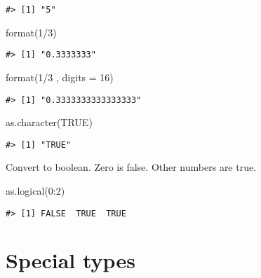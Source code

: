 \documentclass[
]{book}
\newenvironment{Shaded}{\begin{snugshade}}{\end{snugshade}}
\newcommand{\AttributeTok}[1]{\textcolor[rgb]{0.77,0.63,0.00}{#1}}
\newcommand{\ConstantTok}[1]{\textcolor[rgb]{0.00,0.00,0.00}{#1}}
\newcommand{\DecValTok}[1]{\textcolor[rgb]{0.00,0.00,0.81}{#1}}
\newcommand{\FunctionTok}[1]{\textcolor[rgb]{0.00,0.00,0.00}{#1}}
\newcommand{\NormalTok}[1]{#1}
\newcommand{\SpecialCharTok}[1]{\textcolor[rgb]{0.00,0.00,0.00}{#1}}
\begin{document}
\begin{verbatim}
#> [1] "5"
\end{verbatim}

\begin{Shaded}
\begin{Highlighting}[]
\FunctionTok{format}\NormalTok{(}\DecValTok{1}\SpecialCharTok{/}\DecValTok{3}\NormalTok{)}
\end{Highlighting}
\end{Shaded}

\begin{verbatim}
#> [1] "0.3333333"
\end{verbatim}

\begin{Shaded}
\begin{Highlighting}[]
\FunctionTok{format}\NormalTok{(}\DecValTok{1}\SpecialCharTok{/}\DecValTok{3}\NormalTok{ , }\AttributeTok{digits =} \DecValTok{16}\NormalTok{)}
\end{Highlighting}
\end{Shaded}

\begin{verbatim}
#> [1] "0.3333333333333333"
\end{verbatim}

\begin{Shaded}
\begin{Highlighting}[]
\FunctionTok{as.character}\NormalTok{(}\ConstantTok{TRUE}\NormalTok{)}
\end{Highlighting}
\end{Shaded}

\begin{verbatim}
#> [1] "TRUE"
\end{verbatim}

Convert to boolean. Zero is false. Other numbers are true.

\begin{Shaded}
\begin{Highlighting}[]
\FunctionTok{as.logical}\NormalTok{(}\DecValTok{0}\SpecialCharTok{:}\DecValTok{2}\NormalTok{)}
\end{Highlighting}
\end{Shaded}

\begin{verbatim}
#> [1] FALSE  TRUE  TRUE
\end{verbatim}

\hypertarget{special-types}{%
\section{Special types}\label{special-types}}
\end{document}
